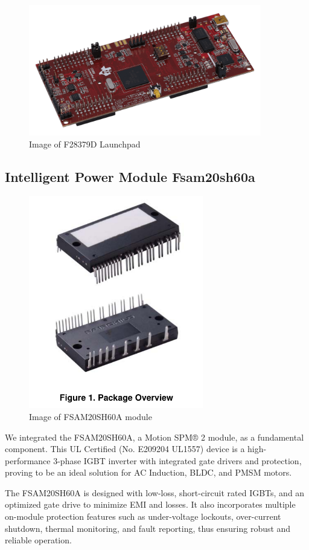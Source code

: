 \begin{figure}[H]
	\centering
	\includegraphics[width=4in]{sections/section4/images/f23879d/launchxl-f28379d-angled.png}
	\caption{Image of F28379D Launchpad}
\end{figure}


\subsection{Intelligent Power Module Fsam20sh60a}

\begin{figure}[H]
	\centering
	\includegraphics[width=3in]{sections/section4/images/IPM/ipm.png}
	\caption{Image of FSAM20SH60A module}
\end{figure}


We integrated the FSAM20SH60A, a Motion SPM® 2 module, as a fundamental component. This UL Certified (No. E209204 UL1557) device is a high-performance 3-phase IGBT inverter with integrated gate drivers and protection, proving to be an ideal solution for AC Induction, BLDC, and PMSM motors.

The FSAM20SH60A is designed with low-loss, short-circuit rated IGBTs, and an optimized gate drive to minimize EMI and losses. It also incorporates multiple on-module protection features such as under-voltage lockouts, over-current shutdown, thermal monitoring, and fault reporting, thus ensuring robust and reliable operation. 

